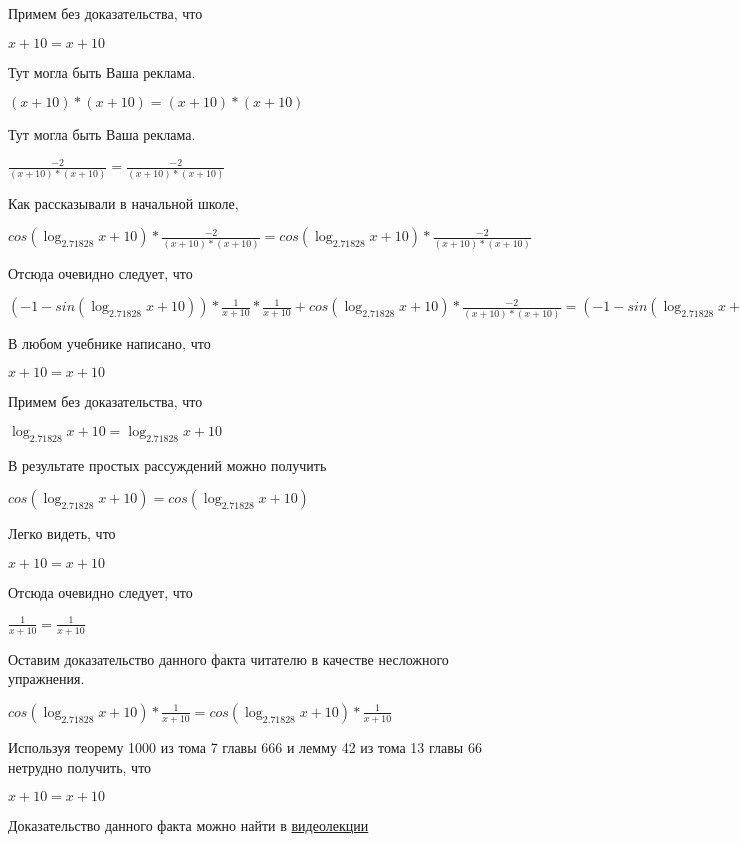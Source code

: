 \documentclass[12pt,a4paper,fleqn]{article}
\theoremstyle{definition}
\begin{document}
Примем без доказательства, что 

$ x  +  10  =  x  +  10 $

Тут могла быть Ваша реклама. 

$( x  +  10 ) * ( x  +  10 ) = ( x  +  10 ) * ( x  +  10 )$

Тут могла быть Ваша реклама. 

$\frac{ -2 }{( x  +  10 ) * ( x  +  10 )}
 = \frac{ -2 }{( x  +  10 ) * ( x  +  10 )}
$

Как рассказывали в начальной школе, 

$cos(\log_{ 2.71828 }{ x  +  10 }) * \frac{ -2 }{( x  +  10 ) * ( x  +  10 )}
 = cos(\log_{ 2.71828 }{ x  +  10 }) * \frac{ -2 }{( x  +  10 ) * ( x  +  10 )}
$

Отсюда очевидно следует, что 

$( -1  - sin(\log_{ 2.71828 }{ x  +  10 })) * \frac{ 1 }{ x  +  10 }
 * \frac{ 1 }{ x  +  10 }
 + cos(\log_{ 2.71828 }{ x  +  10 }) * \frac{ -2 }{( x  +  10 ) * ( x  +  10 )}
 = ( -1  - sin(\log_{ 2.71828 }{ x  +  10 })) * \frac{ 1 }{ x  +  10 }
 * \frac{ 1 }{ x  +  10 }
 + cos(\log_{ 2.71828 }{ x  +  10 }) * \frac{ -2 }{( x  +  10 ) * ( x  +  10 )}
$

В любом учебнике написано, что 

$ x  +  10  =  x  +  10 $

Примем без доказательства, что 

$\log_{ 2.71828 }{ x  +  10 } = \log_{ 2.71828 }{ x  +  10 }$

В результате простых рассуждений можно получить 

$cos(\log_{ 2.71828 }{ x  +  10 }) = cos(\log_{ 2.71828 }{ x  +  10 })$

Легко видеть, что 

$ x  +  10  =  x  +  10 $

Отсюда очевидно следует, что 

$\frac{ 1 }{ x  +  10 }
 = \frac{ 1 }{ x  +  10 }
$

Оставим доказательство данного факта читателю в качестве несложного упражнения. 

$cos(\log_{ 2.71828 }{ x  +  10 }) * \frac{ 1 }{ x  +  10 }
 = cos(\log_{ 2.71828 }{ x  +  10 }) * \frac{ 1 }{ x  +  10 }
$

Используя теорему 1000 из тома 7 главы 666 и лемму 42 из тома 13 главы 66 нетрудно получить, что 

$ x  +  10  =  x  +  10 $

Доказательство данного факта можно найти в \href{https://www.youtube.com/watch?v=dQw4w9WgXcQ}{видеолекции} 
\end{document}

